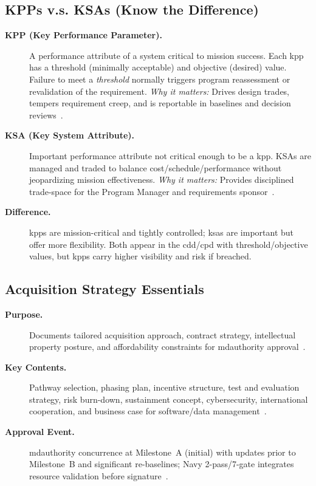\documentclass[../main.tex]{subfiles}
\begin{document}
\subsection{KPPs v.s. KSAs (Know the Difference)}
\begin{description}
  \item[\textbf{KPP (Key Performance Parameter).}] A performance attribute of a system critical to mission success. Each \ac{kpp} has a threshold (minimally acceptable) and objective (desired) value. Failure to meet a \emph{threshold} normally triggers program reassessment or revalidation of the requirement. \emph{Why it matters:} Drives design trades, tempers requirement creep, and is reportable in baselines and decision reviews~\autocite{CJCSI5123-01H}.
  \item[\textbf{KSA (Key System Attribute).}] Important performance attribute not critical enough to be a \ac{kpp}. KSAs are managed and traded to balance cost/schedule/performance without jeopardizing mission effectiveness. \emph{Why it matters:} Provides disciplined trade-space for the Program Manager and requirements sponsor~\autocite{CJCSI5123-01H}.
  \item[\textbf{Difference.}] \acp{kpp} are mission-critical and tightly controlled; \acp{ksa} are important but offer more flexibility. Both appear in the \ac{cdd}/\ac{cpd} with threshold/objective values, but \acp{kpp} carry higher visibility and risk if breached.
\end{description}

\subsection{Acquisition Strategy Essentials}
\begin{description}
	\item[\textbf{Purpose.}] Documents tailored acquisition approach, contract strategy, intellectual property posture, and affordability constraints for \ac{mdauthority} approval~\autocite{DoDI5000-85}.
	\item[\textbf{Key Contents.}] Pathway selection, phasing plan, incentive structure, test and evaluation strategy, risk burn-down, sustainment concept, cybersecurity, international cooperation, and business case for software/data management~\autocite{DoDI5000-85,DoDD5000-01}.
	\item[\textbf{Approval Event.}] \ac{mdauthority} concurrence at Milestone~A (initial) with updates prior to Milestone~B and significant re-baselines; Navy 2-pass/7-gate integrates resource validation before signature~\autocite{OPNAVINST5000-42E}.
\end{description}
\end{document}
